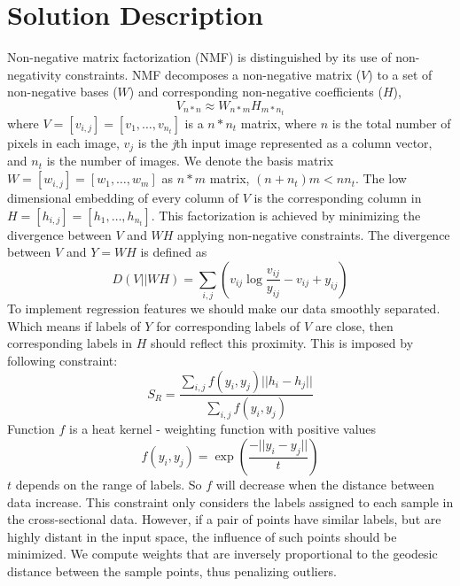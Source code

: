 \documentclass[12pt]{article}
\begin{document}
\section{Solution Description}

	Non-negative matrix factorization (NMF) is distinguished by its use of non-negativity constraints. NMF decomposes a non-negative matrix ($V$) to a set of non-negative bases ($W$) and corresponding non-negative coefficients ($H$),
	$$V_{n*n} \approx W_{n*m}H_{m*n_{t}}$$
	where $V = [v_{i,j}] = [v_{1}, \dots, v_{n_{t}}]$ is a $n*n_{t}$ matrix, where $n$ is the total number of pixels in each image, $v_{j}$ is the \textit{j}th input image represented as a column vector, and $n_{t}$ is the number of images. We denote the basis matrix $W = [w_{i,j}] = [w_{1}, \dots, w_{m}]$ as $n * m$ matrix, $(n + n_{t})m < nn_{t}$. The low dimensional embedding of every column of $V$ is the corresponding column in $H = [h_{i,j}] = [h_{1}, \dots, h_{n_{t}}]$. This factorization is achieved by minimizing the divergence between $V$ and $WH$ applying non-negative constraints. The divergence between $V$ and $Y = WH$ is defined as ~\cite{Lee} ~\cite{Lee2}
	$$D(V||WH) = \sum_{i,j}(v_{ij}\log{\frac{v_{ij}}{y_{ij}} - v_{ij} + y_{ij}})$$
	To implement regression features we should make our data smoothly separated. Which means if labels of $Y$ for corresponding labels of $V$ are close, then corresponding labels in $H$ should reflect this proximity. This is imposed by following constraint:
	$$S_{R} = \frac{\sum_{i,j}f(y_{i}, y_{j})||h_{i} - h_{j}||}{\sum_{i,j}f(y_{i}, y_{j})}$$
	Function $f$ is a heat kernel - weighting function with positive values
	$$f(y_{i}, y_{j}) = \exp(\frac{-||y_{i}-y_{j}||}{t})$$
	$t$ depends on the range of labels. So $f$ will decrease when the distance between data increase. This constraint only considers the labels assigned to each sample in the cross-sectional data. However, if a pair of points have similar labels, but are highly distant in the input space, the influence of such points should be minimized. We compute weights that are inversely proportional to the geodesic distance between the sample points, thus penalizing outliers.
	
	\pagebreak
	
\end{document}
